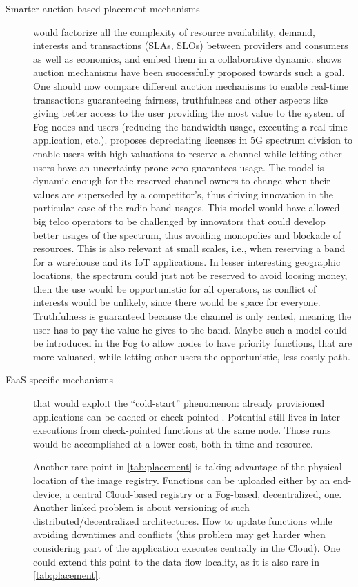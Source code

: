 \documentclass[11pt]{sdm}
\begin{document}
\begin{description}
	\item[Smarter auction-based placement mechanisms] would factorize all the complexity of resource availability, demand, interests and transactions (\glspl{SLA}, \glspl{SLO}) between providers and consumers as well as economics, and embed them in a collaborative dynamic.  shows auction mechanisms have been successfully proposed towards such a goal. One should now compare different auction mechanisms to enable real-time transactions guaranteeing fairness, truthfulness and other aspects like giving better access to the user providing the most value to the system of Fog nodes and users (reducing the bandwidth usage, executing a real-time application, etc.). \citet{milgrom_redesigning_2017} proposes depreciating licenses in 5G spectrum division to enable users with high valuations to reserve a channel while letting other users have an uncertainty-prone zero-guarantees usage. The model is dynamic enough for the reserved channel owners to change when their values are superseded by a competitor's, thus driving innovation in the particular case of the radio band usages. This model would have allowed big telco operators to be challenged by innovators that could develop better usages of the spectrum, thus avoiding monopolies and blockade of resources. This is also relevant at small scales, i.e., when reserving a band for a warehouse and its \gls{IoT} applications. In lesser interesting geographic locations, the spectrum could just not be reserved to avoid loosing money, then the use would be opportunistic for all operators, as conflict of interests would be unlikely, since there would be space for everyone. Truthfulness is guaranteed because the channel is only rented, meaning the user has to pay the value he gives to the band. Maybe such a model could be introduced in the Fog to allow nodes to have priority functions, that are more valuated, while letting other users the opportunistic, less-costly path.

	\item[\gls{FaaS}-specific mechanisms] that would exploit the ``cold-start'' phenomenon: already provisioned applications can be cached or check-pointed \cite{karhula_checkpointing_2019}. Potential still lives in later executions from check-pointed functions at the same node. Those runs would be accomplished at a lower cost, both in time and resource.

	Another rare point in \cref{tab:placement} is taking advantage of the physical location of the image registry. Functions can be uploaded either by an end-device, a central Cloud-based registry or a Fog-based, decentralized, one. Another linked problem is about versioning of such distributed/decentralized architectures. How to update functions while avoiding downtimes and conflicts (this problem may get harder when considering part of the application executes centrally in the Cloud). One could extend this point to the data flow locality, as it is also rare in \cref{tab:placement}.


\end{description}
\end{document}
